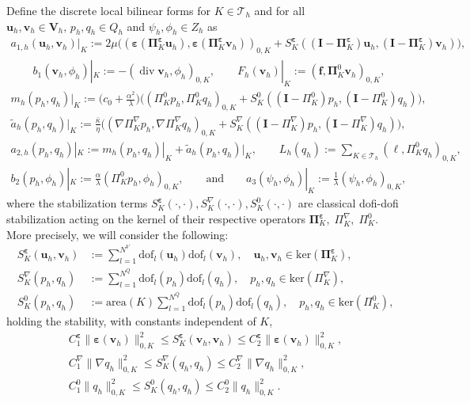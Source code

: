 \documentclass[smallextended]{svjour3}
\numberwithin{equation}{section}
\numberwithin{figure}{section}
\numberwithin{table}{section}
\newcommand\bI{\mathbf{I}}
\newcommand\bV{\mathbf{V}}
\newcommand\bPi{\boldsymbol{\Pi}}
\newcommand\ff{\boldsymbol{f}}
\newcommand\beps{\boldsymbol{\varepsilon}}
\newcommand\bu{\boldsymbol{u}}
\newcommand\bv{\boldsymbol{v}}
\newcommand\cT{\mathcal{T}}
\newcommand\vdiv{{\mathop{\mathrm{div}}\nolimits}}
\begin{document}
    Define the discrete local bilinear forms for $K \in \cT_h$ and for all $\bu_h, \bv_h \in \bV_h,\, p_h, q_h \in Q_h$ and $\psi_h, \phi_h \in Z_h$ as
	\begin{gather*}
		a_{1,h}(\bu_h, \bv_h)|_K := 2 \mu \Big( ( \beps( \bPi^{\beps}_K \bu_h), \beps( \bPi^{\beps}_K \bv_h))_{0,K} + S^{\beps}_K ( (\bI - \bPi^{\beps}_K) \bu_h, (\bI - \bPi^{\beps}_K) \bv_h) \Big),  \\
		\qquad b_1(\bv_h, \phi_h) |_K := - (\vdiv \bv_h,  \phi_h)_{0, K}, \qquad
		F_h(\bv_h)|_K := (\ff ,  \bPi^{0}_K \bv_h )_{0, K}, \\
		m_h(p_h,q_h)|_K  := \biggl( c_0 +\frac{\alpha^2}{{\lambda}}\biggr) \Big(
		( \Pi^{0}_K p_h, \Pi^{0}_K  q_h)_{0, K} + S^{0}_K( (\boldsymbol{I} - \Pi^{0}_K) p_h, (\boldsymbol{I} - \Pi^{0}_K) q_h)  \Big), \\
		\tilde{a}_h(p_h,q_h) |_K  :=\frac{\bar{\kappa}}{\eta}  \Big((\nabla \Pi^{\nabla}_K p_h, \nabla \Pi^{\nabla}_K q_h)_{0, K} + S^{\nabla}_K( (\boldsymbol{I} - \Pi^{\nabla}_K) p_h, (\boldsymbol{I} - \Pi^{\nabla}_K) q_h)  \Big),
		\\
		a_{2,h}(p_h,q_h)|_K:= m_h(p_h,q_h)|_K +\tilde{a}_h(p_h,q_h) |_K , \qquad L_h(q_h) :=  \sum_{K \in \cT_h} ( \ell, \Pi^{0}_K q_h)_{0, K},\\
		b_2(p_h,\phi_h)|_K:=  \frac{\alpha}{{\lambda}}  ( \Pi^{0}_K p_h, \phi_h)_{0, K}, \qquad \text{and} \qquad
		a_3(\psi_h,\phi_h) |_K:=  \frac{1}{\lambda} (\psi_h, \phi_h)_{0,K},
	\end{gather*}
	where the stabilization terms $S^{\beps}_K(\cdot, \cdot), S^{\nabla}_K(\cdot, \cdot), S^0_K(\cdot, \cdot)$ are classical dofi-dofi stabilization acting on the kernel of their respective operators $\bPi^{\beps}_K,\; \Pi^{\nabla}_K,\; \Pi^0_K$. More precisely, we will consider the following:
    \begin{align*}
	S^{\beps}_K(\bu_h,\bv_h) &:= \sum_{l=1}^{N^V} \text{dof}_l(\bu_h) \text{dof}_l(\bv_h), \quad \bu_h, \bv_h \in \text{ker}(\bPi^{\beps}_K),\\
	S^{\nabla}_K(p_h,q_h) &:= \sum_{l=1}^{N^Q} \text{dof}_l(p_h) \text{dof}_l(q_h), \quad p_h, q_h \in \text{ker} (\Pi^{\nabla}_K), \\
	S^0_K(p_h,q_h) &:= \text{area}(K) \sum_{l=1}^{N^Q} \text{dof}_l(p_h) \text{dof}_l(q_h), \quad p_h, q_h \in \text{ker} (\Pi^0_K),
	\end{align*}
    holding the stability, with constants independent of $K$,
	\begin{gather*}
		 C^{\beps}_1 \| \beps(\bv_h) \|_{0, K}^2 \le S^{\beps}_K ( \bv_h, \bv_h) \le  C^{\beps}_2 \| \beps(\bv_h) \|_{0, K}^2, \\
         C^{\nabla}_1\| \nabla q_h \|_{0, K}^2  \le S^{\nabla}_K( q_h, q_h)  \le  C^{\nabla}_2 \| \nabla q_h \|_{0, K}^2,\\
		 C^0_1 \| q_h \|_{0, K}^2  \le  S^{0}_K( q_h, q_h)  \le  C^0_2\| q_h \|_{0, K}^2.
	\end{gather*}
\end{document}
